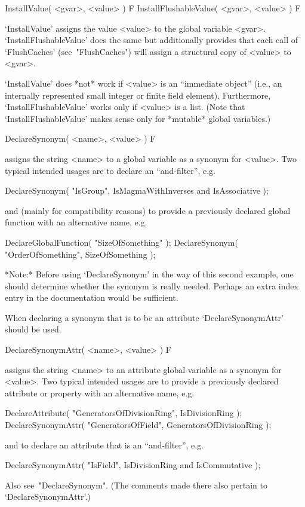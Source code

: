 \>InstallValue( <gvar>, <value> ) F
\>InstallFlushableValue( <gvar>, <value> ) F

`InstallValue' assigns the value <value> to the global variable <gvar>.
`InstallFlushableValue' does the same but additionally provides that
each call of `FlushCaches' (see~"FlushCaches")
will assign a structural copy of <value> to <gvar>.

`InstallValue' does *not* work if <value> is an ``immediate object''
(i.e., an internally represented small integer or finite field element).
Furthermore, `InstallFlushableValue' works only if <value> is a list.
(Note that `InstallFlushableValue' makes sense only for *mutable*
global variables.)

\>DeclareSynonym( <name>, <value> ) F

assigns the string <name> to a global variable as a synonym for <value>.
Two typical intended usages are to declare an ``and-filter'', e.g.

\begintt
DeclareSynonym( "IsGroup", IsMagmaWithInverses and IsAssociative );
\endtt

and (mainly for compatibility reasons) to provide a previously declared
global function with an alternative name, e.g.

\begintt
DeclareGlobalFunction( "SizeOfSomething" );
DeclareSynonym( "OrderOfSomething", SizeOfSomething );
\endtt

*Note:* Before using `DeclareSynonym' in the way of this second example,
one should determine whether the synonym is really needed. Perhaps an
extra index entry in the documentation would be sufficient. 

When declaring a synonym that is to be an attribute `DeclareSynonymAttr'
should be used.

\>DeclareSynonymAttr( <name>, <value> ) F

assigns the string <name> to an attribute global variable as a synonym for
<value>.  Two typical intended usages are to provide a previously declared
attribute or property with an alternative name, e.g.

\begintt
DeclareAttribute( "GeneratorsOfDivisionRing", IsDivisionRing );
DeclareSynonymAttr( "GeneratorsOfField", GeneratorsOfDivisionRing );
\endtt

and to declare an attribute that is an ``and-filter'', e.g.

\begintt
DeclareSynonymAttr( "IsField", IsDivisionRing and IsCommutative );
\endtt

Also see~"DeclareSynonym". (The comments made there also pertain to
`DeclareSynonymAttr'.)

